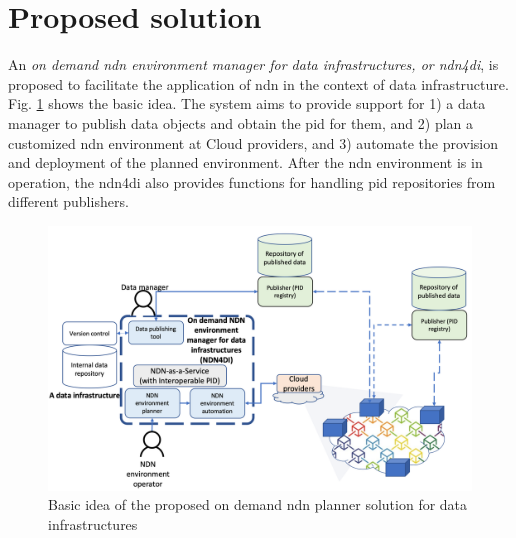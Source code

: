 \documentclass[conference]{IEEEtran}
\begin{document}
 

\section{Proposed solution}
An \emph{on demand \gls{ndn} environment manager for data infrastructures, or \gls{ndn4di}}, is proposed to facilitate the application of \gls{ndn} in the context of data infrastructure. Fig. \ref{fig:architecture-new} shows the basic idea. The system aims to provide support for 1) a data manager to publish data objects and obtain the \gls{pid} for them, and 2) plan a customized \gls{ndn} environment at Cloud providers, and 3) automate the provision and deployment of the planned environment. After the \gls{ndn} environment is in operation, the \gls{ndn4di} also provides functions for handling \gls{pid} repositories from different publishers.  

\begin{figure}[ht]
\centering
\includegraphics[width=\columnwidth]{images/NDN-pub-planner.png}
\caption{Basic idea of the proposed on demand \gls{ndn} planner solution for data infrastructures}
\label{fig:architecture-new}
\end{figure}
\end{document}
